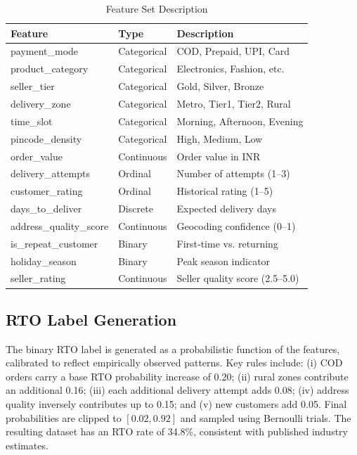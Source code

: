 \documentclass[conference]{IEEEtran}
\begin{document}
\begin{table}[h]
\caption{Feature Set Description}
\label{tab:features}
\centering
\begin{tabular}{lll}
\toprule
\textbf{Feature} & \textbf{Type} & \textbf{Description} \\
\midrule
payment\_mode       & Categorical & COD, Prepaid, UPI, Card \\
product\_category   & Categorical & Electronics, Fashion, etc. \\
seller\_tier        & Categorical & Gold, Silver, Bronze \\
delivery\_zone      & Categorical & Metro, Tier1, Tier2, Rural \\
time\_slot          & Categorical & Morning, Afternoon, Evening \\
pincode\_density    & Categorical & High, Medium, Low \\
order\_value        & Continuous  & Order value in INR \\
delivery\_attempts  & Ordinal     & Number of attempts (1--3) \\
customer\_rating    & Ordinal     & Historical rating (1--5) \\
days\_to\_deliver   & Discrete    & Expected delivery days \\
address\_quality\_score & Continuous & Geocoding confidence (0--1) \\
is\_repeat\_customer & Binary    & First-time vs. returning \\
holiday\_season     & Binary      & Peak season indicator \\
seller\_rating      & Continuous  & Seller quality score (2.5--5.0) \\
\bottomrule
\end{tabular}
\end{table}

\subsection{RTO Label Generation}

The binary RTO label is generated as a probabilistic function of the features, calibrated to reflect empirically observed patterns. Key rules include: (i) COD orders carry a base RTO probability increase of 0.20; (ii) rural zones contribute an additional 0.16; (iii) each additional delivery attempt adds 0.08; (iv) address quality inversely contributes up to 0.15; and (v) new customers add 0.05. Final probabilities are clipped to $[0.02, 0.92]$ and sampled using Bernoulli trials. The resulting dataset has an RTO rate of 34.8\%, consistent with published industry estimates.
\end{document}
